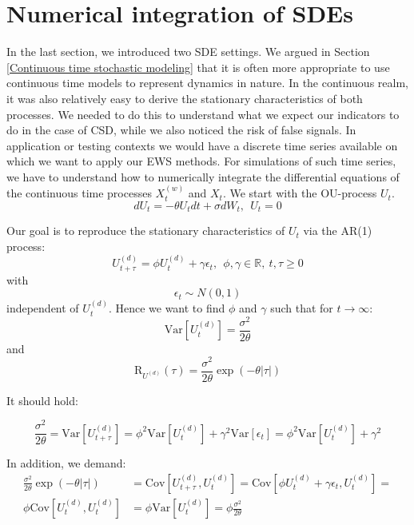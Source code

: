 \documentclass[%
thesis=student,%
coverpage=false,%
titlepage=false,%
headmarks=true, %
english,%
font=libertine, %
math=newpxtx, %
BCOR=5mm,%
coverBCOR=11mm%
]{tumbook}
\begin{document}
\chapter{Numerical integration of SDEs}

In the last section, we introduced two SDE settings. We argued in Section \ref{Continuous time stochastic modeling} that it is often more appropriate to use continuous time models to represent dynamics in nature. In the continuous realm, it was also relatively easy to derive the stationary characteristics of both processes. We needed to do this to understand what we expect our indicators to do in the case of CSD, while we also noticed the risk of false signals. 
In application or testing contexts we would have a discrete time series available on which we want to apply our EWS methods. For simulations of such time series, we have to understand how to numerically integrate the differential equations of the continuous time processes $X_{t}^{(w)}$ and $X_{t}$. We start with the OU-process $U_{t}$.
\[
dU_{t} = -\theta U_{t}dt + \sigma dW_{t}, \ \ U_{t} = 0
\]

Our goal is to reproduce the stationary characteristics of $U_{t}$  via the AR(1) process:
\[
     U_{t+\tau}^{(d)} = \phi U_{t} ^{(d)}+ \gamma \epsilon_{t}, \ \ \phi, \gamma \in \mathbb{R}, \ t,\tau \geq 0
\]
with 
\[
\epsilon_{t} \sim N(0,1)
\]
independent of $U_{t}^{(d)}$.
Hence we want to find $\phi$ and $\gamma$ such that for $t \rightarrow \infty$:
\[
\mathrm{Var}[U_{t}^{(d)}] = \frac{\sigma^{2}}{2\theta}
\]
and 
\[
\mathrm{R}_{U^{(d)}}(\tau) = \frac{\sigma ^2}{2\theta}\exp(-\theta\lvert \tau \rvert)
\]

It should hold:

\begin{equation*}
    \frac{\sigma^2}{2\theta} = \text{Var}[U_{t+\tau} ^{(d)}] = \phi ^2 \text{Var}[U_{t} ^{(d)}] + \gamma ^2 \text{Var}[\epsilon_{t}] = \phi ^2 \text{Var}[U_{t} ^{(d)}] + \gamma ^2
\end{equation*}

In addition, we demand: 
  \begin{align*} 
      \frac{\sigma ^2}{2\theta}\exp(-\theta\lvert \tau \rvert) &= \text{Cov}[U_{t+\tau} ^{(d)},U_{t} ^{(d)}] = \text{Cov}[\phi U_{t} ^{(d)} + \gamma \epsilon_{t}, U_{t}^{(d)}] = \\
      \phi\text{Cov}[U_{t}^{(d)},U_{t}^{(d)}] &= \phi \text{Var}[U_{t}^{(d)}] = \phi \frac{\sigma^2}{2\theta}
  \end{align*}
\end{document}
